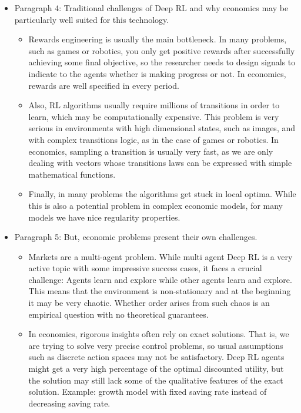 \documentclass[11pt,english]{article}
\begin{document}
\begin{itemize}
	\item Paragraph 4: Traditional challenges of Deep RL and why economics may be particularly well suited for this technology.\medskip
	
	\begin{itemize}
		\item Rewards engineering is usually the main bottleneck. In many problems, such as games or robotics, you only get positive rewards after successfully achieving some final objective, so the researcher needs to design signals to indicate to the agents whether is making progress or not. In economics, rewards are well specified in every period. \medskip
		
		\item Also, RL algorithms usually require millions of transitions in order to learn, which may be computationally expensive. This problem is very serious in environments with high dimensional states, such as images, and with complex transitions logic, as in the case of games or robotics. In economics, sampling a transition is usually very fast, as we are only dealing with vectors whose transitions laws can be expressed with simple mathematical functions. \medskip
		
		\item Finally, in many problems the algorithms get stuck in local optima. While this is also a potential problem in complex economic models, for many models we have nice regularity properties. \medskip
	\end{itemize}
	
	\item Paragraph 5: But, economic problems present their own challenges. \medskip
	
	\begin{itemize}
		\item Markets are a multi-agent problem. While multi agent Deep RL is a very active topic with some impressive success cases, it faces a crucial challenge: Agents learn and explore while other agents learn and explore. This means that the environment is non-stationary and at the beginning it may be very chaotic. Whether order arises from such chaos is an empirical question with no theoretical guarantees. \medskip
		
		\item In economics, rigorous insights often rely on exact solutions. That is, we are trying to solve very precise control problems, so usual assumptions such as discrete action spaces may not be satisfactory. Deep RL agents might get a very high percentage of the optimal discounted utility, but the solution may still lack some of the qualitative features of the exact solution. Example: growth model with fixed saving rate instead of decreasing saving rate. \medskip
	\end{itemize}

	\end{itemize}
\end{document}
